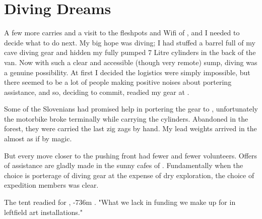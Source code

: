 \section{Diving Dreams}

A few more carries and a visit to the fleshpots and Wifi of , and
I needed to decide what to do next. My big hope was diving; I had
stuffed a barrel full of my cave diving gear and hidden my fully pumped
7 Litre cylinders in the back of the van. Now with such a clear and
accessible (though very remote) sump, diving was a genuine possibility.
At first I decided the logistics were simply impossible, but there
seemed to be a lot of people making positive noises about portering
assistance, and so, deciding to commit, readied my gear at .

Some of the Slovenians had promised help in portering the gear to ,
unfortunately the motorbike broke terminally while carrying the
cylinders. Abandoned in the forest, they were carried the last zig zags
by hand. My lead weights arrived in the  almost as if by magic.

But every move closer to the pushing front had fewer and fewer
volunteers. Offers of assistance are gladly made in the sunny cafes of
. Fundamentally when the choice is porterage of diving gear at the
expense of dry exploration, the choice of expedition members was clear.

\begin{marginfigure}
\checkoddpage \ifoddpage \forcerectofloat \else \forceversofloat \fi
\centering
 \caption{The tent readied for , -736m . "What we lack in funding we make up for in leftfield art installations." }
 \label{red cow tent}
\end{marginfigure}

